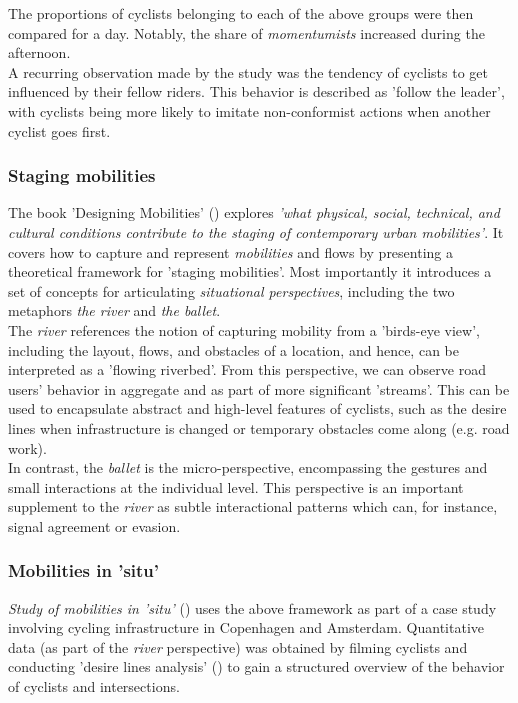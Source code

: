 The proportions of cyclists belonging to each of the above groups were then compared for a day. 
Notably, the share of \textit{momentumists} increased during the afternoon.
 \ \\

A recurring observation made by the study was the tendency of cyclists to get influenced by their fellow riders. 
This behavior is described as 'follow the leader', with cyclists being more likely to imitate non-conformist 
actions when another cyclist goes first. 

\subsubsection{Staging mobilities}
The book 'Designing Mobilities' (\cite{designinig_mobilities}) explores \textit{'what physical, social, technical, 
and cultural conditions contribute to the staging of contemporary urban mobilities'}.
It covers how to capture and represent \textit{mobilities} and flows by presenting a theoretical framework for 'staging mobilities'. 
Most importantly it introduces a set of concepts for articulating \textit{situational perspectives}, 
including the two metaphors \textit{the river} and \textit{the ballet}. 
 \ \\

 The \textit{river} references the notion of capturing mobility from a 'birds-eye view', including the layout, 
 flows, and obstacles of a location, and hence, can be interpreted as a 'flowing riverbed'. 
 From this perspective, we can observe road users' behavior in aggregate and as part of more significant 'streams'. 
 This can be used to encapsulate abstract and high-level features of cyclists, such as the desire lines
 when infrastructure is changed or temporary obstacles come along (e.g. road work).
 \ \\

In contrast, the \textit{ballet} is the micro-perspective, encompassing the gestures and small interactions at the individual level.
This perspective is an important supplement to the \textit{river} as subtle interactional patterns which can, for instance,
 signal agreement or evasion.

\subsubsection{Mobilities in 'situ'}
\textit{Study of mobilities in 'situ'} (\cite{situ}) uses the above framework as part of a case study involving cycling infrastructure in 
Copenhagen and Amsterdam. Quantitative data (as part of the \textit{river} perspective) was obtained by filming cyclists and conducting 
'desire lines analysis' (\cite{cva}) to gain a structured overview of the behavior of cyclists and intersections. 
\ \\

